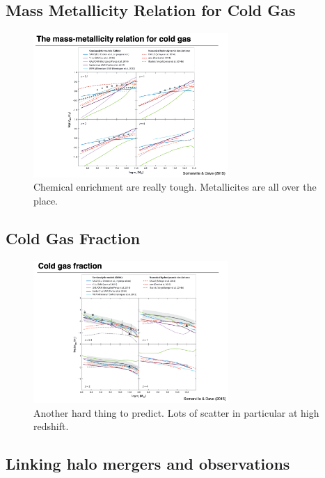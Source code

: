 \documentclass{article}
\begin{document}
\subsection{Mass Metallicity Relation for Cold Gas}

\begin{figure}
    \centering
    \includegraphics[width=0.66\textwidth]{figs/Screen Shot 2021-11-19 at 10.35.12 AM.png}
    \caption{Chemical enrichment are really tough. Metallicites are all over the place. }
    \label{fig:metallicity_sensitivity_in_simulations}
\end{figure}

\subsection{Cold Gas Fraction}

\begin{figure}
    \centering
    \includegraphics[width=0.66\textwidth]{figs/Screen Shot 2021-11-19 at 10.37.30 AM.png}
    \caption{Another hard thing to predict. Lots of scatter in particular at high redshift. }
    \label{fig:cold_gas_Fra}
\end{figure}

\subsection{Linking halo mergers and observations}
\end{document}
